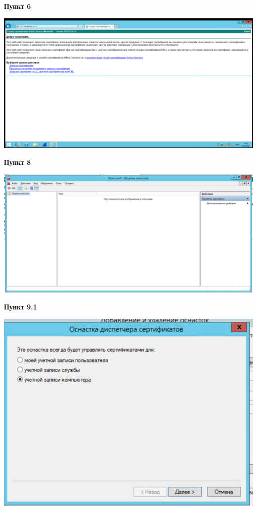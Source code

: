 \documentclass[a4paper,14pt]{extarticle}
\begin{document}
    \newpage
    \textbf{Пункт 6}
    \begin{center}
        \includegraphics[scale=0.4]{6}
    \end{center}
    \textbf{Пункт 8}
    \begin{center}
        \includegraphics[scale=0.5]{8}
    \end{center}
    \newpage
    \textbf{Пункт 9.1}
    \begin{center}
        \includegraphics[scale=0.75]{9.1}
    \end{center}
\end{document}
